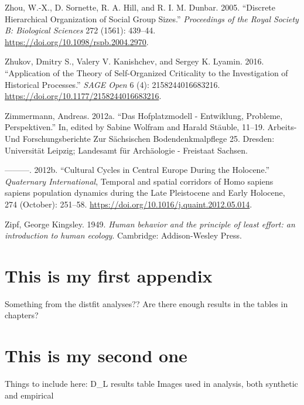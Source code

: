 \documentclass[
  12pt,
  a4paper, twoside]{book}
\newlength{\cslhangindent}
\newlength{\cslentryspacingunit} %
\newenvironment{CSLReferences}[2] %
 {%
  \setlength{\parindent}{0pt}
  \ifodd #1
  \let\oldpar\par
  \def\par{\hangindent=\cslhangindent\oldpar}
  \fi
  \setlength{\parskip}{#2\cslentryspacingunit}
 }%
 {}
\begin{document}
\begin{CSLReferences}{1}{0}
\leavevmode{}%
Zhou, W.-X., D. Sornette, R. A. Hill, and R. I. M. Dunbar. 2005. {``Discrete Hierarchical Organization of Social Group Sizes.''} \emph{Proceedings of the Royal Society B: Biological Sciences} 272 (1561): 439--44. \url{https://doi.org/10.1098/rspb.2004.2970}.

\leavevmode{}%
Zhukov, Dmitry S., Valery V. Kanishchev, and Sergey K. Lyamin. 2016. {``Application of the {Theory} of {Self-Organized Criticality} to the {Investigation} of {Historical Processes}.''} \emph{SAGE Open} 6 (4): 2158244016683216. \url{https://doi.org/10.1177/2158244016683216}.

\leavevmode{}%
Zimmermann, Andreas. 2012a. {``Das Hofplatzmodell - Entwiklung, Probleme, Perspektiven.''} In, edited by Sabine Wolfram and Harald Stäuble, 11--19. Arbeits- Und Forschungsberichte Zur Sächsischen Bodendenkmalpflege 25. Dresden: Universität Leipzig; Landesamt für Archäologie - Freistaat Sachsen.

\leavevmode{}%
---------. 2012b. {``Cultural Cycles in {Central Europe} During the {Holocene}.''} \emph{Quaternary International}, Temporal and spatial corridors of {Homo} sapiens sapiens population dynamics during the {Late Pleistocene} and {Early Holocene}, 274 (October): 251--58. \url{https://doi.org/10.1016/j.quaint.2012.05.014}.

\leavevmode{}%
Zipf, George Kingsley. 1949. \emph{Human behavior and the principle of least effort: an introduction to human ecology}. Cambridge: Addison-Wesley Press.

\end{CSLReferences}

\hypertarget{appendix-appendix}{%
\appendix {}}


\hypertarget{this-is-my-first-appendix}{%
\chapter{This is my first appendix}\label{this-is-my-first-appendix}}

Something from the distfit analyses??
Are there enough results in the tables in chapters?

\hypertarget{this-is-my-second-one}{%
\chapter{This is my second one}\label{this-is-my-second-one}}

Things to include here:
D\_L results table
Images used in analysis, both synthetic and empirical
\end{document}
